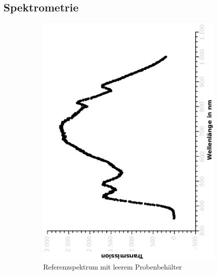 \documentclass{article}
\begin{document}
\subsection{Spektrometrie}

\begin{figure}[H]
\centering
\begin{subfigure}[h]{0.4\textwidth}
\includegraphics[width=\textwidth ,angle=-90]{eps/referenztrans1.eps}
\caption{Referenzspektrum mit leerem Probenbehälter}
\end{subfigure}
\begin{subfigure}[h]{0.4\textwidth}

\end{subfigure}
\end{figure}
\end{document}
